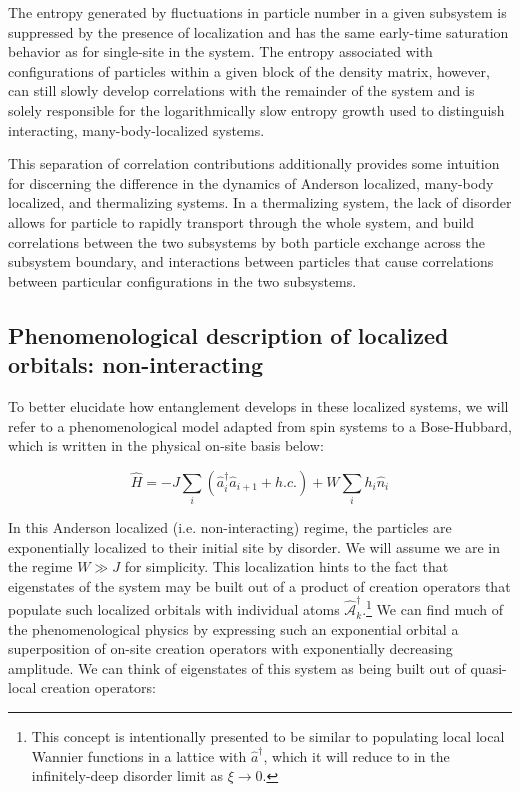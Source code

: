 The entropy generated by fluctuations in particle number in a given subsystem is suppressed by the presence of localization and has the same early-time saturation behavior as for single-site in the system. The entropy associated with configurations of particles within a given block of the density matrix, however, can still slowly develop correlations with the remainder of the system and is solely responsible for the logarithmically slow entropy growth used to distinguish interacting, many-body-localized systems.

This separation of correlation contributions additionally provides some intuition for discerning the difference in the dynamics of Anderson localized, many-body localized, and thermalizing systems. In a thermalizing system, the lack of disorder allows for particle to rapidly transport through the whole system, and build correlations between the two subsystems by both particle exchange across the subsystem boundary, and interactions between particles that cause correlations between particular configurations in the two subsystems. 

\subsection{Phenomenological description of localized orbitals: non-interacting} 

To better elucidate how entanglement develops in these localized systems, we will refer to a phenomenological model adapted from spin systems to a Bose-Hubbard, which is written in the physical on-site basis below:

\begin{equation}
\label{eqn:andyham}
\hat{H} = -J\sum_i \left ( \hat{a}_i^\dagger \hat{a}_{i+1} + h.c. \right ) + W \sum_i h_i \hat{n}_i
\end{equation}

In this Anderson localized (i.e. non-interacting) regime, the particles are exponentially localized to their initial site by disorder. We will assume we are in the regime $W\gg J$ for simplicity. This localization hints to the fact that eigenstates of the system may be built out of a product of creation operators that populate such localized orbitals with individual atoms $\hat{\mathcal{A}}_k^\dagger$.\footnote{This concept is intentionally presented to be similar to populating local local Wannier functions in a lattice with $\hat{a}^\dagger$, which it will reduce to in the infinitely-deep disorder limit as $\xi\rightarrow 0$.} We can find much of the phenomenological physics by expressing such an exponential orbital a superposition of on-site creation operators with exponentially decreasing amplitude. We can think of eigenstates of this system as being built out of quasi-local creation operators: 

